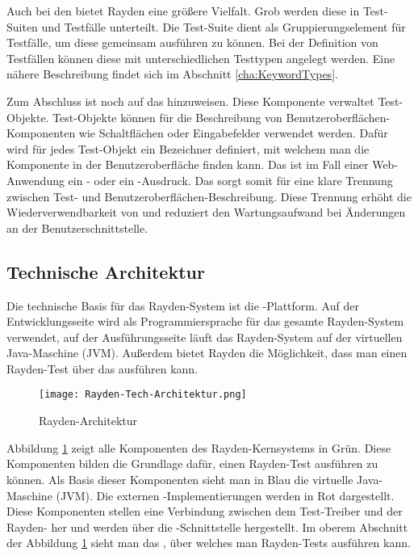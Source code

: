 \SuperPar
Auch bei den  bietet Rayden eine größere Vielfalt. Grob werden diese in Test-Suiten und Testfälle unterteilt. Die Test-Suite dient als Gruppierungselement für Testfälle, um diese gemeinsam ausführen zu können. Bei der Definition von Testfällen können diese mit unterschiedlichen Testtypen angelegt werden. Eine nähere Beschreibung findet sich im Abschnitt \ref{cha:KeywordTypes}.

\SuperPar
Zum Abschluss ist noch auf das  hinzuweisen. Diese Komponente verwaltet Test-Objekte. Test-Objekte können für die Beschreibung von Benutzeroberflächen-Komponenten wie Schaltflächen oder Eingabefelder verwendet werden. Dafür wird für jedes Test-Objekt ein Bezeichner definiert, mit welchem man die Komponente in der Benutzeroberfläche finden kann. Das ist im Fall einer Web-Anwendung ein - oder ein -Ausdruck. Das  sorgt somit für eine klare Trennung zwischen Test- und Benutzeroberflächen-Beschreibung. Diese Trennung erhöht die Wiederverwendbarkeit von  und reduziert den Wartungsaufwand bei Änderungen an der Benutzerschnittstelle.

\subsection{Technische Architektur}
\label{cha:TechArch}

Die technische Basis für das Rayden-System ist die -Plattform. Auf der Entwicklungsseite wird  als Programmiersprache für das gesamte Rayden-System verwendet, auf der Ausführungsseite läuft das Rayden-System auf der virtuellen Java-Maschine (JVM). Außerdem bietet Rayden die Möglichkeit, dass man einen Rayden-Test über das  \cite{JavaScriptApi} ausführen kann. 

\begin{figure}[h]
\centering
\texttt{[image: Rayden-Tech-Architektur.png]}
\caption{Rayden-Architektur}
\label{fig:rayden-tech-arch}
\end{figure}

\SuperPar
Abbildung \ref{fig:rayden-tech-arch} zeigt alle Komponenten des Rayden-Kernsystems in Grün. Diese Komponenten bilden die Grundlage dafür, einen Rayden-Test ausführen zu können. Als Basis dieser Komponenten sieht man in Blau die virtuelle Java-Maschine (JVM). Die externen -Implementierungen werden in Rot dargestellt. Diese Komponenten stellen eine Verbindung zwischen dem Test-Treiber und der Rayden- her und werden über die -Schnittstelle hergestellt. Im oberem Abschnitt der Abbildung \ref{fig:rayden-tech-arch} sieht man das , über welches man Rayden-Tests ausführen kann.


